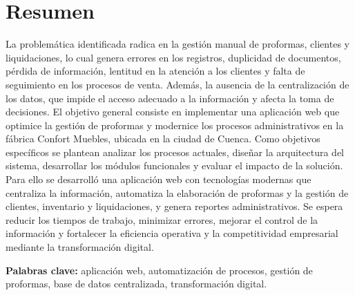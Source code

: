 \chapter*{Resumen} %

\noindent
La problemática identificada radica en la gestión manual de proformas, clientes y liquidaciones, lo cual genera errores en los registros, duplicidad de documentos, pérdida de información, lentitud en la atención a los clientes y falta de seguimiento en los procesos de venta. Además, la ausencia de la centralización de los datos, que impide el acceso adecuado a la información y afecta la toma de decisiones. El objetivo general consiste en implementar una aplicación web que optimice la gestión de proformas y modernice los procesos administrativos en la fábrica Confort Muebles, ubicada en la ciudad de Cuenca. Como objetivos específicos se plantean analizar los procesos actuales, diseñar la arquitectura del sistema, desarrollar los módulos funcionales y evaluar el impacto de la solución. Para ello se desarrolló una aplicación web con tecnologías modernas que centraliza la información, automatiza la elaboración de proformas y la gestión de clientes, inventario y liquidaciones, y genera reportes administrativos. Se espera reducir los tiempos de trabajo, minimizar errores, mejorar el control de la información y fortalecer la eficiencia operativa y la competitividad empresarial mediante la transformación digital.

\vspace{0.3cm}
\noindent
\textbf{Palabras clave:} aplicación web, automatización de procesos, gestión de proformas, base de datos centralizada, transformación digital.
\vfill 

